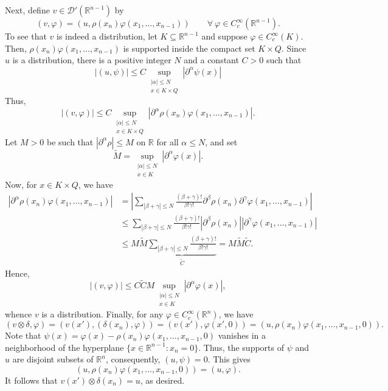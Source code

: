 \documentclass[10pt]{amsart}
\theoremstyle{thmstyle}
\theoremstyle{defstyle}
\newcommand{\R}{\mathbb{R}}
\newcommand{\wt}[1]{\widetilde{#1}}
\renewcommand{\le}{\leqslant}
\begin{document}
Next, define $v\in\mathscr D'(\R^{n - 1})$ by 
\begin{equation*}
    (v, \varphi) = \left(u, \rho(x_n)\varphi(x_1,\dots,x_{n - 1})\right)\qquad\forall~\varphi\in C_c^\infty(\R^{n - 1}).
\end{equation*}
To see that $v$ is indeed a distribution, let $K\subseteq\R^{n - 1}$ and suppose $\varphi\in C_c^\infty(K)$. Then, $\rho(x_n)\varphi(x_1,\dots,x_{n - 1})$ is supported inside the compact set $K\times Q$. Since $u$ is a distribution, there is a positive integer $N$ and a constant $C > 0$ such that 
\begin{equation*}
    |(u, \psi)|\le C\sup_{\substack{|\alpha|\le N\\ x\in K\times Q}} |\partial^\alpha\psi(x)|
\end{equation*}
Thus, 
\begin{equation*}
    |(v,\varphi)|\le C\sup_{\substack{|\alpha|\le N\\ x\in K\times Q}}|\partial^\alpha \rho(x_n)\varphi(x_1,\dots,x_{n - 1})|.
\end{equation*}
Let $M > 0$ be such that $|\partial^\alpha \rho|\le M$ on $\R$ for all $\alpha\le N$, and set 
\begin{equation*}
    \wt M = \sup_{\substack{|\alpha|\le N\\ x\in K}}|\partial^\alpha\varphi(x)|.
\end{equation*}
Now, for $x\in K\times Q$, we have 
\begin{align*}
    \left|\partial^\alpha\rho(x_n)\varphi(x_1,\dots,x_{n - 1})\right| &= \left|\sum_{|\beta + \gamma|\le N}\frac{(\beta + \gamma)!}{\beta!\gamma!}\partial^\beta\rho(x_n)\partial^\gamma\varphi(x_1,\dots,x_{n - 1})\right|\\
    &\le\sum_{|\beta + \gamma|\le N}\frac{(\beta + \gamma)!}{\beta!\gamma!}\left|\partial^\beta\rho(x_n)\right|\left|\partial^\gamma\varphi(x_1,\dots,x_{n - 1})\right|\\
    &\le M\wt M\underbrace{\sum_{|\beta + \gamma|\le N}\frac{(\beta + \gamma)!}{\beta!\gamma!}}_{\wt C} = M\wt M\wt C.
\end{align*}
Hence, 
\begin{equation*}
    |(v, \varphi)|\le C\wt C M\sup_{\substack{|\alpha|\le N\\ x\in K}}|\partial^\alpha\varphi(x)|,
\end{equation*}
whence $v$ is a distribution. Finally, for any $\varphi\in C_c^\infty(\R^n)$, we have 
\begin{equation*}
    (v\otimes\delta, \varphi) = \left(v(x'), \left(\delta(x_n),\varphi\right)\right) = (v(x'), \varphi(x', 0)) = (u, \rho(x_n)\varphi(x_1,\dots,x_{n - 1}, 0)).
\end{equation*}
Note that $\psi(x) = \varphi(x) - \rho(x_n)\varphi(x_1,\dots,x_{n - 1}, 0)$ vanishes in a neighborhood of the hyperplane $\{x\in\R^{n - 1}\colon x_n = 0\}$. Thus, the supports of $\psi$ and $u$ are disjoint subsets of $\R^n$,  consequently, $(u, \psi) = 0$. This gives
\begin{equation*}
    (u, \rho(x_n)\varphi(x_1,\dots,x_{n - 1}, 0)) = (u, \varphi).
\end{equation*}
It follows that $v(x')\otimes\delta(x_n) = u$, as desired.
\end{document}
